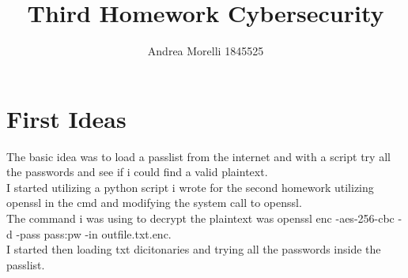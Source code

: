 \documentclass{article}
\title{Third Homework Cybersecurity}
\author{Andrea Morelli 1845525}
\date{}
\begin{document}
\maketitle

\section{First Ideas}
The basic idea was to load a passlist from the internet and with a script try all the passwords and see if i could find a valid plaintext.\\
I started utilizing a python script i wrote for the second homework utilizing openssl in the cmd and modifying the system call to openssl.\\
The command i was using to decrypt the plaintext was openssl enc -aes-256-cbc -d -pass pass:pw -in outfile.txt.enc.\\
I started then loading txt dicitonaries and trying all the passwords inside the passlist.\\
\end{document}
